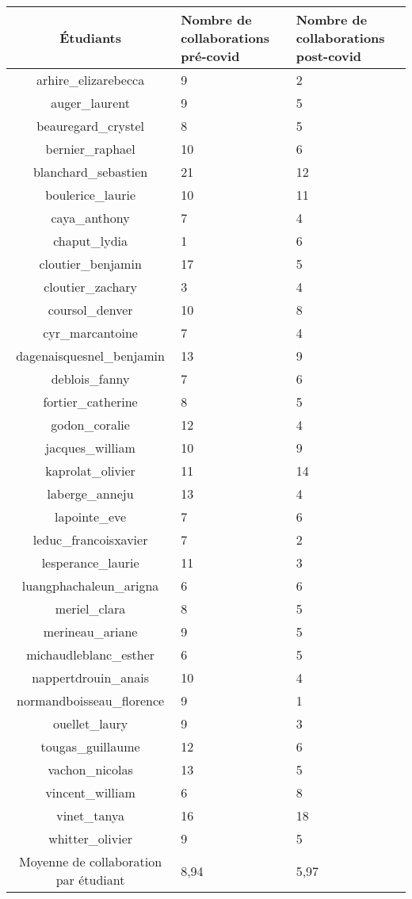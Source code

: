 
\begin{center}
\begin{tabular}{|c|p{3cm}|p{3cm}|}

\hline
Étudiants & Nombre de collaborations pré-covid & Nombre de collaborations post-covid\\
\hline
arhire\_elizarebecca & 9 & 2\\
\hline
auger\_laurent & 9 & 5\\
\hline
beauregard\_crystel & 8 & 5\\
\hline
bernier\_raphael & 10 & 6\\
\hline
blanchard\_sebastien & 21 & 12\\
\hline
boulerice\_laurie & 10 & 11\\
\hline
caya\_anthony & 7 & 4\\
\hline
chaput\_lydia & 1 & 6\\
\hline
cloutier\_benjamin & 17 & 5\\
\hline
cloutier\_zachary & 3 & 4\\
\hline
coursol\_denver & 10 & 8\\
\hline
cyr\_marcantoine & 7 & 4\\
\hline
dagenaisquesnel\_benjamin & 13 & 9\\
\hline
deblois\_fanny & 7 & 6\\
\hline
fortier\_catherine & 8 & 5\\
\hline
godon\_coralie & 12 & 4\\
\hline
jacques\_william & 10 & 9\\
\hline
kaprolat\_olivier & 11 & 14\\
\hline
laberge\_anneju & 13 & 4\\
\hline
lapointe\_eve & 7 & 6\\
\hline
leduc\_francoisxavier & 7 & 2\\
\hline
lesperance\_laurie & 11 & 3\\
\hline
luangphachaleun\_arigna & 6 & 6\\
\hline
meriel\_clara & 8 & 5\\
\hline
merineau\_ariane & 9 & 5\\
\hline
michaudleblanc\_esther & 6 & 5\\
\hline
nappertdrouin\_anais & 10 & 4\\
\hline
normandboisseau\_florence & 9 & 1\\
\hline
ouellet\_laury & 9 & 3\\
\hline
tougas\_guillaume & 12 & 6\\
\hline
vachon\_nicolas & 13 & 5\\
\hline
vincent\_william & 6 & 8\\
\hline
vinet\_tanya & 16 & 18\\
\hline
whitter\_olivier & 9 & 5\\
\hline
Moyenne de collaboration par étudiant & 8,94 & 5,97 \\
\hline
\end{tabular}
\end{center}
